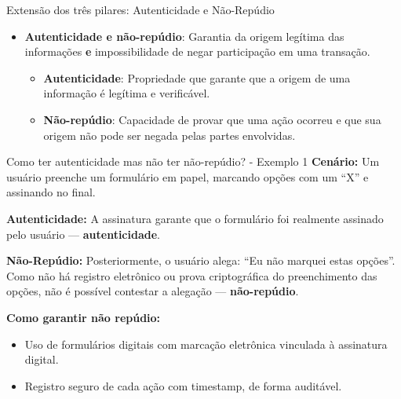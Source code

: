 \begin{frame}{Extensão dos três pilares: Autenticidade e Não-Repúdio}

    \begin{itemize}
        \item \textbf{Autenticidade e não-repúdio}: Garantia da origem legítima das informações \textbf{e} impossibilidade de negar participação em uma transação.
              \begin{itemize}
                  \item \textbf{Autenticidade}: Propriedade que garante que a origem de uma informação é legítima e verificável.
                  \item  \textbf{Não-repúdio}: Capacidade de provar que uma ação ocorreu e que sua origem não pode ser negada pelas partes envolvidas.\\
              \end{itemize}


    \end{itemize}





\end{frame}

\begin{frame}{Como ter autenticidade mas não ter não-repúdio? - Exemplo 1}
    \textbf{Cenário:} Um usuário preenche um formulário em papel, marcando opções com um “X” e assinando no final.

    \medskip
    \textbf{Autenticidade:}
    A assinatura garante que o formulário foi realmente assinado pelo usuário — \textbf{autenticidade}.

    \medskip
    \textbf{Não-Repúdio:}
    Posteriormente, o usuário alega: ``Eu não marquei estas opções''.
    Como não há registro eletrônico ou prova criptográfica do preenchimento das opções, não é possível contestar a alegação — \textbf{não-repúdio}.

    \medskip
    \textbf{Como garantir não repúdio:}
    \begin{itemize}
        \item Uso de formulários digitais com marcação eletrônica vinculada à assinatura digital.
        \item Registro seguro de cada ação com timestamp, de forma auditável.
    \end{itemize}
\end{frame}


